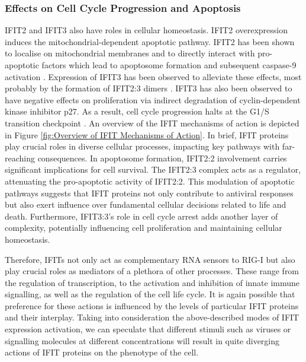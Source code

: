 \subsubsection{Effects on Cell Cycle Progression and Apoptosis} \label{Effects on Cell Cycle Progression and Apoptosis}
IFIT2 and IFIT3 also have roles in cellular homeostasis. IFIT2 overexpression induces the mitochondrial-dependent apoptotic pathway. IFIT2 has been shown to localise on mitochondrial membranes and to directly interact with pro-apoptotic factors which lead to apoptosome formation and subsequent caspase-9 activation \cite{Chen2017InhibitionApoptosis, Diamond2013TheProteins}. Expression of IFIT3 has been observed to alleviate these effects, most probably by the formation of IFIT2:3 dimers \cite{Mears2018BetterResponse, Stawowczyk2011TheApoptosis}. IFIT3 has also been observed to have negative effects on proliferation via indirect degradation of cyclin-dependent kinase inhibitor p27. As a result, cell cycle progression halts at the G1/S transition checkpoint \cite{Xiao2006RIG-GProteins}. An overview of the IFIT mechanisms of action is depicted in Figure \ref{fig:Overview of IFIT Mechanisms of Action}. In brief, IFIT proteins play crucial roles in diverse cellular processes, impacting key pathways with far-reaching consequences. In apoptosome formation, IFIT2:2 involvement carries significant implications for cell survival. The IFIT2:3 complex acts as a regulator, attenuating the pro-apoptotic activity of IFIT2:2. This modulation of apoptotic pathways suggests that IFIT proteins not only contribute to antiviral responses but also exert influence over fundamental cellular decisions related to life and death. Furthermore, IFIT3:3's role in cell cycle arrest adds another layer of complexity, potentially influencing cell proliferation and maintaining cellular homeostasis.

Therefore, IFITs not only act as complementary RNA sensors to RIG-I but also play crucial roles as mediators of a plethora of other processes. These range from the regulation of transcription, to the activation and inhibition of innate immune signalling, as well as the regulation of the cell life cycle. It is again possible that preference for these actions is influenced by the levels of particular IFIT proteins and their interplay. Taking into consideration the above-described modes of IFIT expression activation, we can speculate that different stimuli such as viruses or signalling molecules at different concentrations will result in quite diverging actions of IFIT proteins on the phenotype of the cell.

